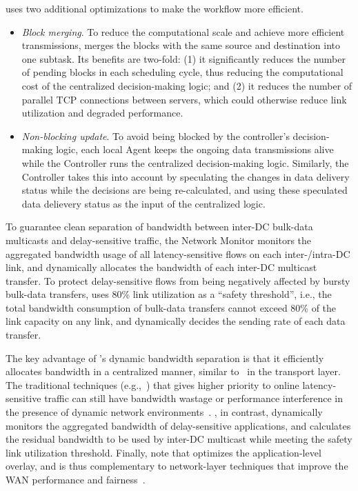 \name uses two additional optimizations to make the workflow
more efficient.
\begin{itemize}
\item \emph{Block merging}.
To reduce the computational scale and achieve more efficient
transmissions, \name merges the blocks with the same source and
destination into one subtask. Its benefits are two-fold: (1) it
significantly reduces the number of pending blocks in each
scheduling cycle, thus reducing the computational cost of the
centralized decision-making logic; and (2) it reduces the number
of parallel TCP connections between servers, which could
otherwise reduce link utilization and degraded performance.
\item \emph{Non-blocking update}.
To avoid being blocked by the controller's decision-making logic,
each local Agent  keeps the ongoing data transmissions alive while
the Controller runs the centralized decision-making logic.
Similarly, the Controller takes this into account by speculating
the changes in data delivery status while the decisions are being
re-calculated, and using these speculated data delievery status as
the input of the centralized logic.
\end{itemize}

\label{subsec:system:separation}

To guarantee clean separation of bandwidth between inter-DC
bulk-data multicasts and delay-sensitive traffic, the \name Network
Monitor monitors the aggregated bandwidth usage of all
latency-sensitive flows on each inter-/intra-DC link, and
dynamically allocates the bandwidth of each inter-DC multicast
transfer. To protect delay-sensitive flows from being negatively
affected by bursty bulk-data transfers, \name uses 80\% link
utilization as a ``safety threshold'', i.e., the total bandwidth
consumption of bulk-data transfers cannot exceed 80\% of the link
capacity on any link, and dynamically decides the sending rate
of each data transfer.

The key advantage of \name's dynamic bandwidth separation is that it
efficiently allocates bandwidth in a centralized manner,
similar to~\cite{kumar2015bwe} in the transport layer. The traditional
techniques (e.g.,~\cite{kumar2015bwe}) that gives higher priority to
online latency-sensitive traffic can still have bandwidth wastage or
performance interference in the presence of dynamic network
environments~\cite{wang2017toward}. \name, in contrast, dynamically monitors the aggregated
bandwidth of delay-sensitive applications, and calculates the
residual bandwidth to be used by inter-DC multicast while meeting the
safety link utilization threshold. Finally, note that \name optimizes
the application-level overlay, and is thus complementary to
network-layer techniques that improve the WAN performance and
fairness~\cite{chen2012design, kavulya2010analysis, mishra2010towards, reiss2012heterogeneity}.


